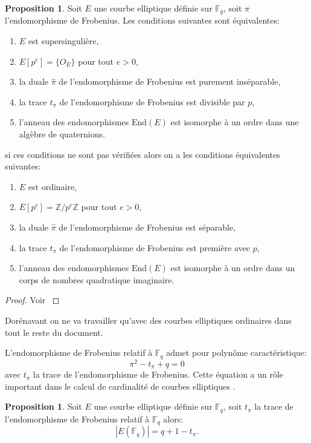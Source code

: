 \documentclass[10pt,a4paper]{book}
\theoremstyle{plain}
\theoremstyle{definition}
\theoremstyle{definition}
\theoremstyle{definition}
\theoremstyle{definition}
\newtheorem{prop}[thm]{Proposition}
\theoremstyle{definition}
\theoremstyle{remark}
\theoremstyle{remark}
\theoremstyle{definition}
\begin{document}
\begin{prop}
\label{pro:fro:dis}
Soit $E$ une courbe elliptique définie sur $\mathbb{F}_q$, soit $\pi$ l'endomorphisme de Frobenius. Les conditions suivantes sont équivalentes:
\begin{enumerate}
\item $E$ est supersingulière,
\item $E[p^e]=\{O_E\}$ pour tout $e > 0$,
\item la duale $\widehat{\pi}$ de l'endomorphisme de Frobenius est purement inséparable,
\item la trace $t_{\pi}$ de l'endomorphisme de Frobenius est divisible par $p$,
\item l'anneau des endomorphismes $\mathrm{End}(E)$ est isomorphe à un ordre dans une algèbre de quaternions.
\end{enumerate}
si ces conditions ne sont pas vérifiées alors on a les conditions équivalentes suivantes:
\begin{enumerate}
\item $E$ est ordinaire,
\item $E[p^e]=\mathbb{Z}/p^e\mathbb{Z}$ pour tout $e > 0$,
\item la duale $\widehat{\pi}$ de l'endomorphisme de Frobenius est séparable,
\item la trace $t_{\pi}$ de l'endomorphisme de Frobenius est première avec $p$,
\item l'anneau des endomorphismes $\mathrm{End}(E)$ est isomorphe à un ordre dans un corps de nombres quadratique imaginaire.
\end{enumerate}
\end{prop}

\begin{proof}
Voir \cite[Theorem V.3.1]{Silv1}
\end{proof}

Dorénavant on ne va travailler qu'avec des courbes elliptiques ordinaires dans 
tout le reste du document.

L'endomorphisme de Frobenius relatif à $\mathbb{F}_q$ admet pour polynôme caractéristique:
\begin{equation}
\pi^2-t_{\pi}+q=0
\end{equation}
avec $t_{\pi}$ la trace de l'endomorphisme de Frobenius. Cette équation a un rôle important dans le calcul de cardinalité de courbes elliptiques \cite{Schoof85}.

\begin{prop}
Soit $E$ une courbe elliptique définie sur $\mathbb{F}_q$, soit $t_{\pi}$ la trace de l'endomorphisme de Frobenius relatif à $ \mathbb{F}_q$ alors:
\begin{equation*}
|E(\mathbb{F}_q)|=q+1-t_{\pi}.
\end{equation*}
\end{prop}
\end{document}

